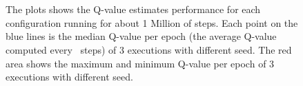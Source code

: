 \begin{figure}[]
	\centering
	 \quad
	 \\
	 \quad
	 \\
	
	\caption{The plots shows the Q-value estimates performance for each configuration running for about 1 Million of steps. %
	Each point on the blue lines is the median Q-value per epoch (the average Q-value computed every \numepoch~steps) of 3 executions with different seed. The red area shows the maximum and minimum Q-value per epoch of 3 executions with different seed.}
	\label{fig:q-values}
\end{figure}


